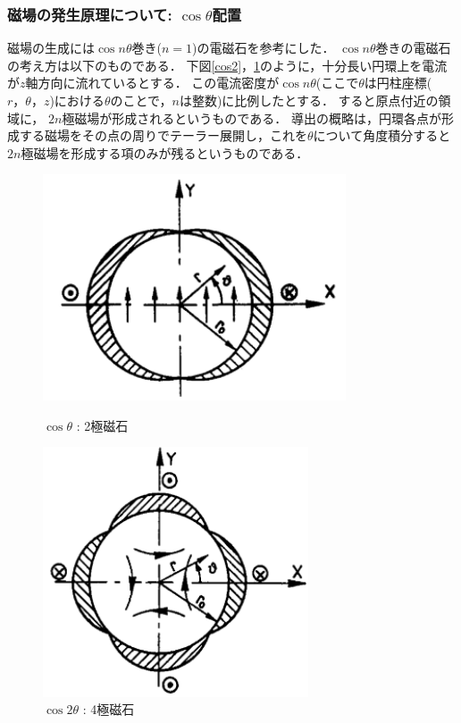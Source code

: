 \subsubsection{磁場の発生原理について: $\cos \theta$配置}
磁場の生成には$\cos n\theta$巻き($n=1$)の電磁石を参考にした．
$\cos n \theta$巻きの電磁石の考え方は以下のものである．
下図\ref{cos2}，\ref{cos4}のように，十分長い円環上を電流が$z$軸方向に流れているとする．
この電流密度が$\cos n\theta$(ここで$\theta$は円柱座標($r，\theta，z$)における$\theta$のことで，$n$は整数)に比例したとする．
すると原点付近の領域に， $2n$極磁場が形成されるというものである．
導出の概略は，円環各点が形成する磁場をその点の周りでテーラー展開し，これを$\theta$について角度積分すると$2n$極磁場を形成する項のみが残るというものである．

\begin{figure}[H]
  \begin{minipage}{0.45\hsize}
    \begin{center}
      \includegraphics[width=0.8\textwidth]{figure/tajima/cos.png}
    \end{center}
    \caption{$\cos\theta$ : 2極磁石}
    \label{cos2}
  \end{minipage}
  \hfill
  \begin{minipage}{0.45\hsize}
    \begin{center}
      \includegraphics[width=0.7\textwidth]{figure/tajima/cos2.png}
    \end{center}
    \caption{$\cos2\theta$ : 4極磁石}
    \label{cos4}
  \end{minipage}
\end{figure}
